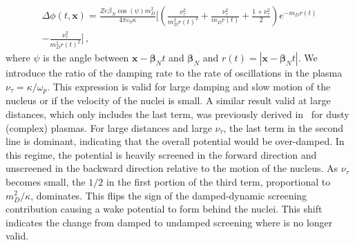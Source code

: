 \begin{multline}\label{eq:pos_point_DDS}
\Delta \phi(t,\boldsymbol{x}) = \frac{Ze \beta_N \cos (\psi) m_D^2}{4 \pi \varepsilon_0 \kappa} \Bigg[\left(\frac{\nu_\tau^2}{m_D^2 r(t)^2} + \frac{\nu_\tau^2}{m_D r(t)}+\frac{1 + \nu_\tau^2}{2}\right)e^{-m_D r(t)} \\ -\frac{\nu_\tau^2}{m_D^2 r(t)^2}\Bigg]\,,
\end{multline}
where $\psi$ is the angle between $\boldsymbol{x}-\boldsymbol{\beta}_N t$ and $\boldsymbol{\beta}_N$ and $r(t) = |\boldsymbol{x}-\boldsymbol{\beta}_N t|$.
We introduce the ratio of the damping rate to the rate of oscillations in the plasma $\nu_\tau = \kappa/\omega_p$.  This expression is valid for large damping and slow motion of the nucleus or if the velocity of the nuclei is small. A similar result valid at large distances, which only includes the last term, was previously derived in~\cite{Stenflo:1973} for dusty (complex) plasmas. For large distances and large $\nu_\tau$, the last term in the second line is dominant, indicating that the overall potential would be over-damped. In this regime, the potential is heavily screened in the forward direction and unscreened in the backward direction relative to the motion of the nucleus. As $\nu_\tau$ becomes small, the $1/2$ in the first portion of the third term, proportional to $m_D^2/\kappa$, dominates. This flips the sign of the damped-dynamic screening contribution causing a wake potential to form behind the nuclei. This shift indicates the change from damped to undamped screening where  is no longer valid. 

